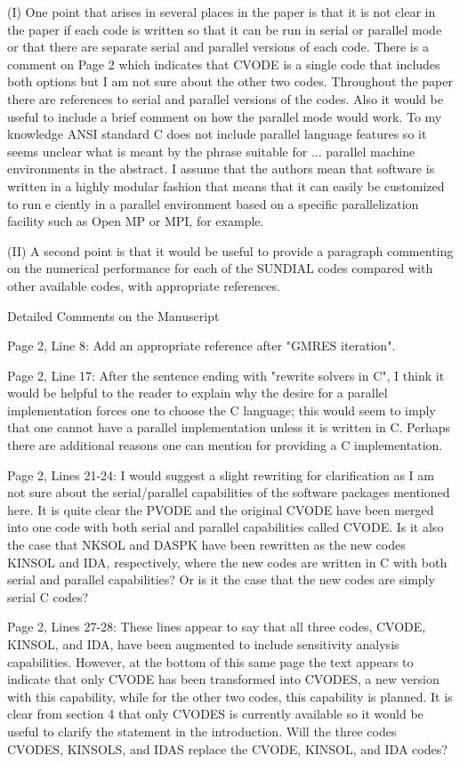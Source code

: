 \documentclass[12pt]{letter}
\begin{document}
(I) One point that arises in several places in the paper is that it is
not clear in the paper if each code is written so that it can be run
in serial or parallel mode or that there are separate serial and
parallel versions of each code. There is a comment on Page 2 which
indicates that CVODE is a single code that includes both options but I
am not sure about the other two codes.  Throughout the paper there are
references to serial and parallel versions of the codes.  Also it
would be useful to include a brief comment on how the parallel mode
would work.  To my knowledge ANSI standard C does not include parallel
language features so it seems unclear what is meant by the phrase
suitable for ... parallel machine environments in the abstract.  I
assume that the authors mean that software is written in a highly
modular fashion that means that it can easily be customized to run e
ciently in a parallel environment based on a specific parallelization
facility such as Open MP or MPI, for example.

(II) A second point is that it would be useful to provide a paragraph
commenting on the numerical performance for each of the SUNDIAL codes
compared with other available codes, with appropriate references.

Detailed Comments on the Manuscript

Page 2, Line 8: Add an appropriate reference after "GMRES iteration".  

Page 2, Line 17: After the sentence ending with "rewrite solvers in C",
I think it would be helpful to the reader to explain why the desire
for a parallel implementation forces one to choose the C language;
this would seem to imply that one cannot have a parallel
implementation unless it is written in C. Perhaps there are additional
reasons one can mention for providing a C implementation. 

Page 2, Lines 21-24: I would suggest a slight rewriting for
clarification as I am not sure about the serial/parallel capabilities
of the software packages mentioned here. It is quite clear the PVODE
and the original CVODE have been merged into one code with both serial
and parallel capabilities called CVODE. Is it also the case that NKSOL
and DASPK have been rewritten as the new codes KINSOL and IDA,
respectively, where the new codes are written in C with both serial
and parallel capabilities? Or is it the case that the new codes are
simply serial C codes?

Page 2, Lines 27-28: These lines appear to say that all three codes,
CVODE, KINSOL, and IDA, have been augmented to include sensitivity
analysis capabilities. However, at the bottom of this same page the
text appears to indicate that only CVODE has been transformed into
CVODES, a new version with this capability, while for the other two
codes, this capability is planned. It is clear from section 4 that
only CVODES is currently available so it would be useful to clarify
the statement in the introduction. Will the three codes CVODES,
KINSOLS, and IDAS replace the CVODE, KINSOL, and IDA codes?
\end{document}
